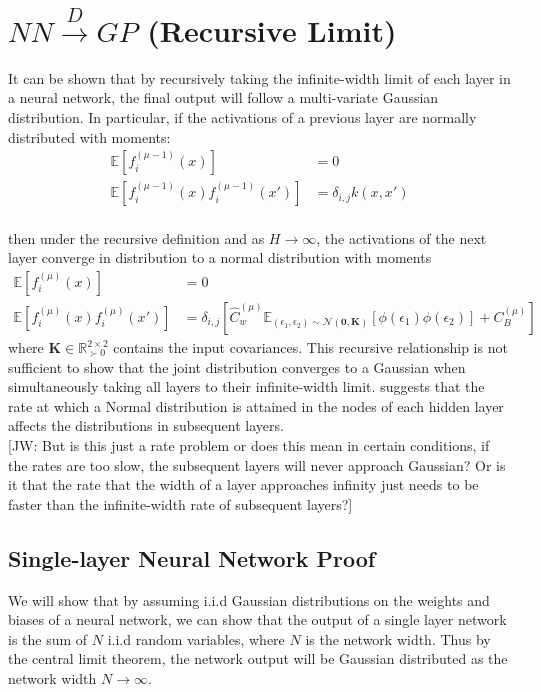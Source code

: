 \documentclass[twoside,11pt]{article}
\newcommand{\jw}[1]{{\color{gray} [JW: #1]}}
\begin{document}
\section{$NN \xrightarrow{D} GP$ (Recursive Limit)}
It can be shown that by recursively taking the infinite-width limit of each layer in a neural network, the final output will follow a multi-variate Gaussian distribution. In particular, if the activations of a previous layer are normally distributed with moments:
\begin{align}
    \mathbb{E}\left[f_i^{(\mu-1)}(x)\right] &= 0 \\
    \mathbb{E}\left[f_i^{(\mu-1)}(x) f_i^{(\mu-1)}(x')\right] &= \delta_{i, j} k(x, x')
\end{align}
\\then under the recursive definition and as $H\rightarrow \infty$, the activations of the next layer converge in distribution to a normal distribution with moments
\begin{align}
    \mathbb{E}\left[f_i^{(\mu)}(x)\right] &= 0\\
    \mathbb{E}\left[f_i^{(\mu)}(x) f_i^{(\mu)}(x')\right] &= \delta_{i, j} \left[\hat{C}^{(\mu)}_w \mathbb{E}_{\left(\epsilon_1, \epsilon_2\right) \sim \mathcal{N}(\mathbf{0}, \mathbf{K})}\left[\phi(\epsilon_1)\phi(\epsilon_2)\right]+C_B^{(\mu)}\right]
\end{align}
where $\mathbf{K} \in \mathbb{R}^{2 \times 2}_{\succ 0}$ contains the input covariances. This recursive relationship is not sufficient to show that the joint distribution converges to a Gaussian when simultaneously taking all layers to their infinite-width limit. \cite{agdeg1804gaussian} suggests that the rate at which a Normal distribution is attained in the nodes of each hidden layer affects the distributions in subsequent layers. 
\\\jw{But is this just a rate problem or does this mean in certain conditions, if the rates are too slow, the subsequent layers will never approach Gaussian? Or is it that the rate that the width of a layer approaches infinity just needs to be faster than the infinite-width rate of subsequent layers?}

\subsection{Single-layer Neural Network Proof \cite{lee2018deep}}
We will show that by assuming i.i.d Gaussian distributions on the weights and biases of a neural network, we can show that the output of a single layer network is the sum of $N$ i.i.d random variables, where $N$ is the network width. Thus by the central limit theorem, the network output will be Gaussian distributed as the network width $N \rightarrow \infty$.
\end{document}
